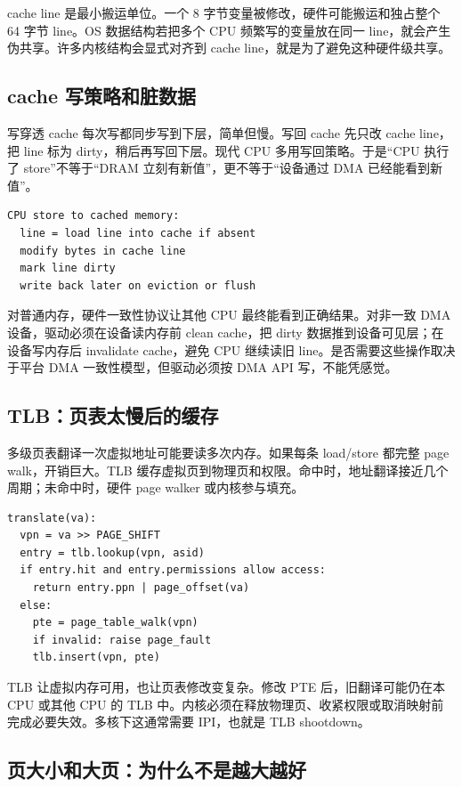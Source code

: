 cache line 是最小搬运单位。一个 8 字节变量被修改，硬件可能搬运和独占整个 64 字节 line。OS 数据结构若把多个 CPU 频繁写的变量放在同一 line，就会产生伪共享。许多内核结构会显式对齐到 cache line，就是为了避免这种硬件级共享。

\subsection{cache 写策略和脏数据}

写穿透 cache 每次写都同步写到下层，简单但慢。写回 cache 先只改 cache line，把 line 标为 dirty，稍后再写回下层。现代 CPU 多用写回策略。于是“CPU 执行了 store”不等于“DRAM 立刻有新值”，更不等于“设备通过 DMA 已经能看到新值”。

\begin{lstlisting}
CPU store to cached memory:
  line = load line into cache if absent
  modify bytes in cache line
  mark line dirty
  write back later on eviction or flush
\end{lstlisting}

对普通内存，硬件一致性协议让其他 CPU 最终能看到正确结果。对非一致 DMA 设备，驱动必须在设备读内存前 clean cache，把 dirty 数据推到设备可见层；在设备写内存后 invalidate cache，避免 CPU 继续读旧 line。是否需要这些操作取决于平台 DMA 一致性模型，但驱动必须按 DMA API 写，不能凭感觉。

\subsection{TLB：页表太慢后的缓存}

多级页表翻译一次虚拟地址可能要读多次内存。如果每条 load/store 都完整 page walk，开销巨大。TLB 缓存虚拟页到物理页和权限。命中时，地址翻译接近几个周期；未命中时，硬件 page walker 或内核参与填充。

\begin{lstlisting}
translate(va):
  vpn = va >> PAGE_SHIFT
  entry = tlb.lookup(vpn, asid)
  if entry.hit and entry.permissions allow access:
    return entry.ppn | page_offset(va)
  else:
    pte = page_table_walk(vpn)
    if invalid: raise page_fault
    tlb.insert(vpn, pte)
\end{lstlisting}

TLB 让虚拟内存可用，也让页表修改变复杂。修改 PTE 后，旧翻译可能仍在本 CPU 或其他 CPU 的 TLB 中。内核必须在释放物理页、收紧权限或取消映射前完成必要失效。多核下这通常需要 IPI，也就是 TLB shootdown。

\subsection{页大小和大页：为什么不是越大越好}

